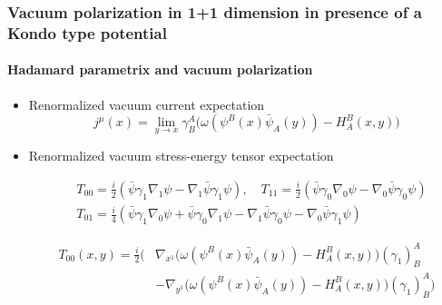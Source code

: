 \documentclass[french]{beamer}
\begin{document}
\begin{frame}
\frametitle{Vacuum polarization in 1+1 dimension in presence of a Kondo type potential}
\framesubtitle{Hadamard parametrix and vacuum polarization}

\begin{itemize}

\item Renormalized vacuum current expectation
\begin{equation*}
j^\mu(x) = \lim_{y \rightarrow x} \gamma^A_B \big(
\omega(\psi^B(x)\bar{\psi}_A(y)) - H^B_A (x, y)\big)
\end{equation*}


\item Renormalized vacuum stress-energy tensor expectation

\begin{equation*}
\begin{split}
& T_{00} = \frac{i}{2} (\bar{\psi} \gamma_1 \nabla_1 \psi - \nabla_1 \bar{\psi}\gamma_1 \psi) , \quad
 T_{11} = \frac{i}{2} (\bar{\psi} \gamma_0 \nabla_0 \psi - \nabla_0 \bar{\psi}\gamma_0 \psi)  \\
& T_{01} = \frac{i}{4} (\bar{\psi} \gamma_1 \nabla_0 \psi +\bar{\psi} \gamma_0 \nabla_1 \psi - \nabla_1 \bar{\psi}\gamma_0 \psi - \nabla_0 \bar{\psi}\gamma_1 \psi)  
\end{split}
\end{equation*}

\begin{equation*}
\begin{split}
T_{00}(x,y) = 
\frac{i}{2}\Big( & 
\nabla_{x^1}\big(\omega(  \psi^B(x) \bar{\psi}_A(y))-H^B_A(x,y)\big)(\gamma_1)^A_B \\
& - \nabla_{y^1}\Big(\omega( \psi^B(x)  \bar{\psi}_A(y)) - H^B_A(x,y)\big)(\gamma_1)^A_B \Big)   
\end{split}
\end{equation*}

\end{itemize}
\end{frame}
\end{document}
